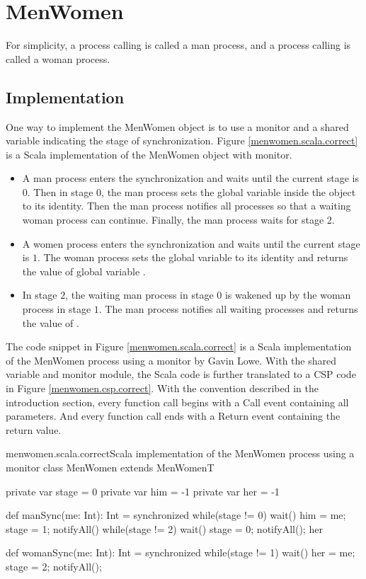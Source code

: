 \documentclass{article}
\begin{document}
\section{MenWomen}
For simplicity, a process calling  is called a man process, and a process calling  is called a woman process. 

\subsection{Implementation}
One way to implement the MenWomen object is to use a monitor and a shared variable indicating the stage of synchronization. Figure \ref{menwomen.scala.correct} is a Scala implementation of the MenWomen object with monitor.
\begin{itemize}
  \item A man process enters the synchronization and waits until the current stage is $0$. Then in stage $0$, the man process sets the global variable  inside the  object to its identity. Then the man process notifies all processes so that a waiting woman process can continue. Finally, the man process waits for stage 2.
  \item A women process enters the synchronization and waits until the current stage is $1$. The woman process sets the global variable  to its identity and returns the value of global variable .
  \item In stage $2$, the waiting man process in stage $0$ is wakened up by the woman process in stage $1$. The man process notifies all waiting processes and returns the value of .
\end{itemize}

The code snippet in Figure \ref{menwomen.scala.correct} is a Scala implementation of the MenWomen process using a monitor by Gavin Lowe. With the shared variable and monitor module, the Scala code is further translated to a CSP code in Figure \ref{menwomen.csp.correct}. With the convention described in the introduction section, every function call begins with a Call event containing all parameters. And every function call ends with a Return event containing the return value.

\begin{scalainline}{menwomen.scala.correct}{Scala implementation of the MenWomen process using a monitor}
class MenWomen extends MenWomenT{
  private var stage = 0
  private var him = -1
  private var her = -1

  def manSync(me: Int): Int = synchronized{
    while(stage != 0) wait()         
    him = me; stage = 1; notifyAll() 
    while(stage != 2) wait()
    stage = 0; notifyAll(); her
  }

  def womanSync(me: Int): Int = synchronized{
    while(stage != 1) wait()
    her = me; stage = 2; notifyAll();
  }
}
\end{scalainline}
\end{document}
